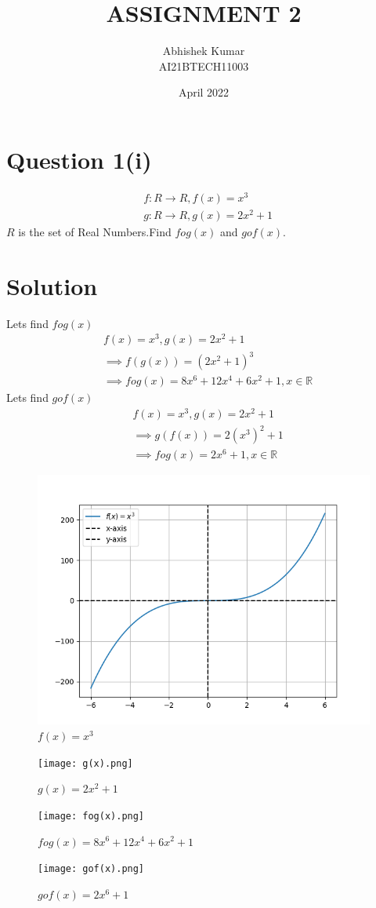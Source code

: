 \documentclass[12pt,a4paper,two column]{article}
\title{ASSIGNMENT 2}
\author{Abhishek Kumar \\AI21BTECH11003}
\date{April 2022}
\begin{document}
	\maketitle
	\section*{Question 1(i)}
	\begin{align}
		&f:R\xrightarrow{} R,f(x)= x^3\\
		&g:R\xrightarrow{} R,g(x)=2x^2+1
	\end{align}
	$R$ is the set of Real Numbers.Find $fog(x)$ and $gof(x)$.
	\section*{Solution}
	Lets find  $fog(x)$
	\begin{align}
		&f(x)=x^3,g(x)=2x^2+1\nonumber\\
		&\implies f(g(x))= (2x^2+1)^3\\
		&\implies fog(x)=8x^6+12x^4+6x^2+1, x\in \mathbb{R}
	\end{align}
	Lets find  $gof(x)$
	\begin{align}
		&f(x)=x^3,g(x)=2x^2+1\nonumber\\
		&\implies g(f(x))= 2(x^3)^2+1\\
		&\implies fog(x)= 2x^6+1,x \in \mathbb{R}
	\end{align}
	\begin{figure}[h]
		\includegraphics[width = \columnwidth]{f(x)}
		\caption{$f(x)=x^3$}
		\label{fig-1}
	\end{figure}
	\begin{figure}
		\centering
		\texttt{[image: g(x).png]}
		\caption{$g(x)=2x^2+1$}
		\label{fig-2}
	\end{figure}
	\begin{figure}
		\centering
		\texttt{[image: fog(x).png]}
		\caption{$fog(x)=8x^6+12x^4+6x^2+1$}
		\label{fig-3}
	\end{figure}
	\begin{figure}
		\centering
		\texttt{[image: gof(x).png]}
		\caption{$gof(x)=2x^6+1$}
		\label{fig-4}
	\end{figure}
	
\end{document}
